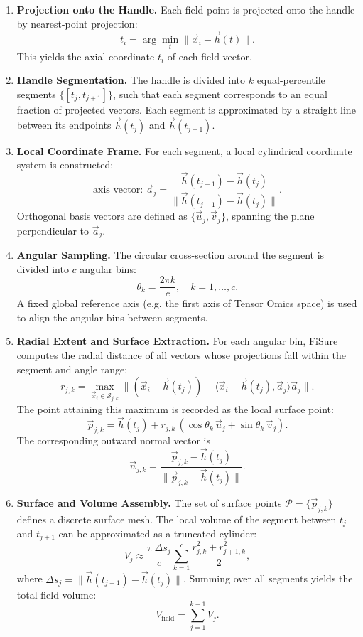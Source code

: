 \documentclass{article}
\begin{document}
\begin{enumerate}
  \item \textbf{Projection onto the Handle.}  
  Each field point is projected onto the handle by nearest-point projection:
  \[
  t_i = \arg\min_t \| \vec{x}_i - \vec{h}(t) \|.
  \]
  This yields the axial coordinate \(t_i\) of each field vector.

  \item \textbf{Handle Segmentation.}  
  The handle is divided into \(k\) equal-percentile segments 
  \(\{[t_j, t_{j+1}]\}\), such that each segment corresponds to 
  an equal fraction of projected vectors.  
  Each segment is approximated by a straight line between its 
  endpoints \(\vec{h}(t_j)\) and \(\vec{h}(t_{j+1})\).

  \item \textbf{Local Coordinate Frame.}  
  For each segment, a local cylindrical coordinate system is constructed:
  \[
  \text{axis vector: } \vec{a}_j = \frac{\vec{h}(t_{j+1}) - \vec{h}(t_j)}
                                   {\|\vec{h}(t_{j+1}) - \vec{h}(t_j)\|}.
  \]
  Orthogonal basis vectors are defined as 
  \(\{\vec{u}_j, \vec{v}_j\}\), spanning the plane perpendicular to \(\vec{a}_j\).

  \item \textbf{Angular Sampling.}  
  The circular cross-section around the segment is divided into 
  \(c\) angular bins:
  \[
  \theta_k = \frac{2\pi k}{c}, \quad k = 1,\ldots,c.
  \]
  A fixed global reference axis (e.g. the first axis of Tensor Omics space) 
  is used to align the angular bins between segments.

  \item \textbf{Radial Extent and Surface Extraction.}  
  For each angular bin, FiSure computes the radial distance of all 
  vectors whose projections fall within the segment and angle range:
  \[
  r_{j,k} = \max_{\vec{x}_i \in \mathcal{S}_{j,k}} 
            \| (\vec{x}_i - \vec{h}(t_j)) - 
            \langle \vec{x}_i - \vec{h}(t_j), \vec{a}_j \rangle \vec{a}_j \|.
  \]
  The point attaining this maximum is recorded as the local surface point:
  \[
  \vec{p}_{j,k} = \vec{h}(t_j) + r_{j,k} \,
                 (\cos\theta_k \, \vec{u}_j + \sin\theta_k \, \vec{v}_j).
  \]
  The corresponding outward normal vector is
  \[
  \vec{n}_{j,k} = 
     \frac{\vec{p}_{j,k} - \vec{h}(t_j)}
          {\|\vec{p}_{j,k} - \vec{h}(t_j)\|}.
  \]

  \item \textbf{Surface and Volume Assembly.}  
  The set of surface points 
  \(\mathcal{P} = \{\vec{p}_{j,k}\}\) defines a discrete 
  surface mesh.  
  The local volume of the segment between 
  \(t_j\) and \(t_{j+1}\) can be approximated as a truncated cylinder:
  \[
  V_j \approx 
     \frac{\pi \, \Delta s_j}{c}
     \sum_{k=1}^{c}
     \frac{r_{j,k}^{2} + r_{j+1,k}^{2}}{2},
  \]
  where \(\Delta s_j = \|\vec{h}(t_{j+1}) - \vec{h}(t_j)\|\).
  Summing over all segments yields the total field volume:
  \[
  V_{\text{field}} = \sum_{j=1}^{k-1} V_j.
  \]
\end{enumerate}
\end{document}
